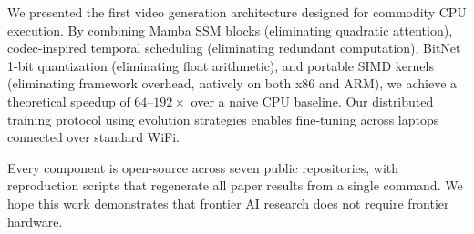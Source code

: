 \documentclass[11pt]{article}
\begin{document}
We presented the first video generation architecture designed for commodity CPU execution. By combining Mamba SSM blocks (eliminating quadratic attention), codec-inspired temporal scheduling (eliminating redundant computation), BitNet 1-bit quantization (eliminating float arithmetic), and portable SIMD kernels (eliminating framework overhead, natively on both x86 and ARM), we achieve a theoretical speedup of $64$--$192\times$ over a naive CPU baseline. Our distributed training protocol using evolution strategies enables fine-tuning across laptops connected over standard WiFi.

Every component is open-source across seven public repositories, with reproduction scripts that regenerate all paper results from a single command. We hope this work demonstrates that frontier AI research does not require frontier hardware.



\end{document}
